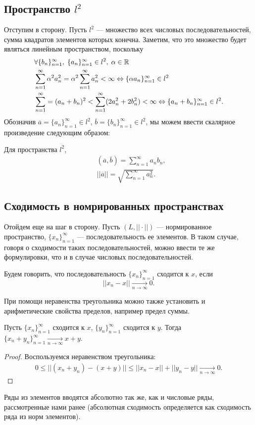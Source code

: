 \documentclass[a4paper, 12pt]{article}
\begin{document}
\subsection{Пространство $l^2$}
Отступим в сторону.
Пусть $l^2$ --- множество всех числовых последовательностей, сумма квадратов элементов которых конечна. Заметим, что это множество будет являться линейным пространством, поскольку
\begin{align*}
    &\forall \{b_n\}_{n=1}^{\infty},\; \{a_n\}_{n=1}^{\infty} \in l^2,\; \alpha \in \mathbb{R}\\
    &\sum\limits_{n=1}^{\infty} \alpha^2 a_n^2 = \alpha^2 \sum\limits_{n=1}^{\infty} a_n^2 < \infty \Leftrightarrow \{\alpha a_n\}_{n=1}^{\infty} \in l^2\\
    &\sum\limits_{n=1}^{\infty} = (a_n+b_n)^2< \sum\limits_{n=1}^{\infty} (2a_n^2 + 2b_n^2) < \infty \Leftrightarrow \{a_n + b_n\}_{n=1}^{\infty} \in l^2.
\end{align*}
Обозначив $\overline{a} = \{a_n\}_{n=1}^{\infty}\in l^2$, $\overline{b} = \{b_n\}_{n=1}^{\infty} \in l^2$, мы можем ввести скалярное произведение следующим образом:
\begin{Def}
    Для пространства $l^2$, 
    \begin{align*}
        &(\overline{a}, \overline{b}) = \sum\limits_{n=1}^{\infty} a_nb_n,\\
        &||\overline{a}|| = \sqrt{\sum\limits_{n=1}^{\infty}a_n^2}.
    \end{align*}
\end{Def}
\subsection{Сходимость в номрированных пространствах}
Отойдем еще на шаг в сторону. Пусть $(L, ||\cdot||)$ --- нормированное пространство, $\{x_n\}_{n=1}^{\infty}$ --- последовательность ее элементов. В таком случае, говоря о сходимости таких последовательностей, можно ввести те же формулировки, что и в случае числовых последовательностей.
\begin{Def}
    Будем говорить, что последовательность $\{x_n\}_{n=1}^{\infty}$ сходится к $x$, если 
    $$
        ||x_n - x|| \underset{n\to \infty}{\to} 0.
    $$
\end{Def}
При помощи неравенства треугольника можно также установить и арифметические свойства пределов, например предел суммы.
\begin{Statement}
    Пусть $\{x_n\}_{n=1}^{\infty}$ сходится к $x$, $\{y_n\}_{n=1}^{\infty}$ сходится к $y$. Тогда  $\{x_n + y_n\}_{n=1}^{\infty} \underset{n\to \infty}{\to} x+y$.
\end{Statement}
\begin{proof}
    Воспользуемся неравенством треугольника:
    \begin{gather*}
        0\leqslant ||(x_n + y_n) - (x + y)|| \leqslant ||x_n-x|| + ||y_n - y|| \underset{n\to\infty}{\to} 0.
    \end{gather*}
\end{proof}
Ряды из элементов вводятся абсолютно так же, как и числовые ряды, рассмотренные нами ранее (абсолютная сходимость определяется как сходимость ряда из норм элементов).
\end{document}
